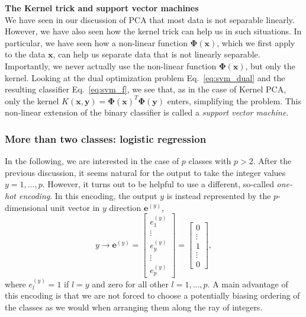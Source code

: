 \noindent
\textbf{The Kernel trick and support vector machines}\\
We have seen in our discussion of PCA that most data is not separable linearly. However, we have also seen how the kernel trick can help us in such situations. In particular, we have seen how a non-linear function $\bm{\Phi}(\bm{x})$, which we first apply to the data $\bm{x}$, can help us separate data that is not linearly separable. Importantly, we never actually use the non-linear function $\bm{\Phi}(\bm{x})$, but only the kernel.
Looking at the dual optimization problem Eq.~\eqref{eq:svm_dual} and the resulting classifier Eq.~\eqref{eq:svm_f}, we see that, as in the case of Kernel PCA, only the kernel $K(\bm{x}, \bm{y}) = \bm{\Phi}(\bm{x})^T\bm{\Phi}(\bm{y})$ enters, simplifying the problem. This non-linear extension of the binary classifier is called a \emph{support vector machine}.


\subsubsection{More than two classes: logistic regression}
In the following, we are interested in the case of $p$ classes with $p>2$.
After the previous discussion, it seems natural for the output to take the integer values $y = 1, \dots, p$. However, it turns out to be helpful to use a different, so-called \emph{one-hot encoding}. In this encoding, the output $y$ is instead represented by the $p$-dimensional unit vector in $y$ direction $\bm{e}^{(y)}$,
\begin{equation} \label{eqn: One-Hot Encoding}
    y \longrightarrow \bm{e}^{(y)} =
    \begin{bmatrix}
        e^{(y)}_1 \\
        \vdots \\
        e^{(y)}_y \\
        \vdots \\
        e^{(y)}_{p}
    \end{bmatrix}
    =
    \begin{bmatrix}
        0 \\
        \vdots \\
        1 \\
        \vdots \\
        0
    \end{bmatrix},
\end{equation}
where $e^{(y)}_l = 1$ if $l = y$  and zero for all other $l=1,\ldots, p$. A main advantage of this encoding is that we are not forced to choose a potentially biasing ordering of the classes as we would when arranging them along the ray of integers.

